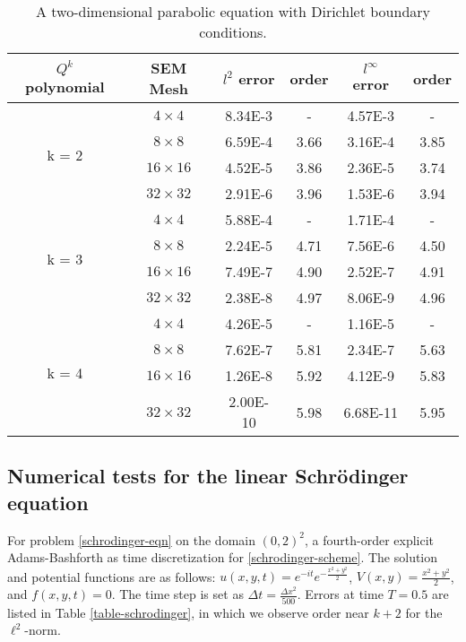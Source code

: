 \documentclass[onefignum,onetabnum]{siamart171218}
\begin{document}
\begin{table}[h]
\centering
\caption{A two-dimensional parabolic equation with Dirichlet boundary conditions.}
\begin{tabular}{|c |c |c c|c c|}
\hline $Q^k$ polynomial  &  SEM Mesh & $l^2$ error  &  order & $l^\infty$ error & order \\
\hline
\multirow{4}{*}{k = 2} 
  &  $4\times 4$ & 8.34E-3 & - & 4.57E-3 & -\\\cline{2-6}
  &  $8\times 8$ & 6.59E-4 & 3.66 & 3.16E-4 & 3.85\\\cline{2-6}
  &  $16\times 16$ & 4.52E-5 & 3.86 & 2.36E-5 & 3.74 \\ \cline{2-6}
  &  $32\times 32$ & 2.91E-6 & 3.96 & 1.53E-6 & 3.94\\ 
\hline
\multirow{4}{*}{k = 3} 
  &  $4\times 4$ & 5.88E-4 & - & 1.71E-4 & -\\\cline{2-6}
  &  $8\times 8$ & 2.24E-5 & 4.71 & 7.56E-6 & 4.50\\\cline{2-6}
  &  $16\times 16$ & 7.49E-7 & 4.90 & 2.52E-7 & 4.91 \\ \cline{2-6}
  &  $32\times 32$ & 2.38E-8 & 4.97 & 8.06E-9 & 4.96\\ 
\hline
\multirow{4}{*}{k = 4} 
  &  $4\times 4$ & 4.26E-5 & - & 1.16E-5 & -\\\cline{2-6}
  &  $8\times 8$ & 7.62E-7 & 5.81 & 2.34E-7 & 5.63\\\cline{2-6}
  &  $16\times 16$ & 1.26E-8 & 5.92 & 4.12E-9 & 5.83 \\ \cline{2-6}
  &  $32\times 32$ & 2.00E-10 & 5.98 & 6.68E-11 & 5.95\\ 
  \hline
\end{tabular}
\label{table-heat}
\end{table}





\subsection{Numerical tests for the linear Schr\"{o}dinger equation}
For problem \eqref{schrodinger-eqn} on the domain $(0,2)^2$,  a fourth-order explicit Adams-Bashforth as time discretization for \eqref{schrodinger-scheme}. The solution and potential functions are as follows: $u(x,y,t) = e^{-it}e^{-\frac{x^2+y^2}{2}}$, $V(x,y)=\frac{x^2+y^2}{2}$, and $f(x,y,t)=0$. The time step is set as $\Delta t = \frac{\Delta x^2}{500}$. 
Errors at time $T = 0.5$ are listed in Table \ref{table-schrodinger}, in which we observe order near $k+2$ for the $\ell^2$-norm.
\end{document}

